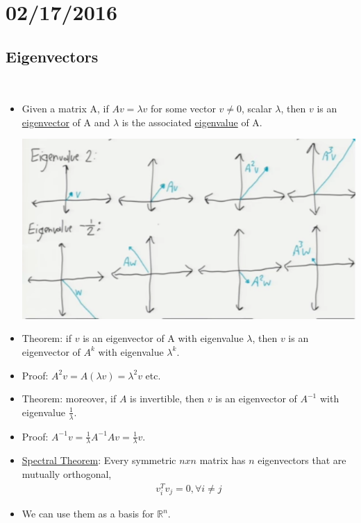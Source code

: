 \documentclass[10pt]{article}
\begin{document}
\newpage
\section*{02/17/2016}
	\subsection*{Eigenvectors}
	\
		\begin{itemize}
			\item Given a matrix A, if $Av = \lambda v$ for some vector $v \neq 0$, scalar $\lambda$, then $v$ is an \underline{eigenvector} of A and $\lambda$ is the associated \underline{eigenvalue} of A.
			
				\begin{center}
					\includegraphics[scale=0.5]{images/eigenvectors}
				\end{center}
			\item Theorem: if $v$ is an eigenvector of A with eigenvalue $\lambda$, then $v$ is an eigenvector of $A^{k}$ with eigenvalue $\lambda^{k}$.
			\item Proof: $A^{2}v = A(\lambda v) = \lambda^{2}v$ etc.
			\item Theorem: moreover, if $A$ is invertible, then $v$ is an eigenvector of $A^{-1}$ with eigenvalue $\frac{1}{\lambda}$.
			\item Proof: $A^{-1}v = \frac{1}{\lambda}A^{-1}Av = \frac{1}{\lambda}v$.
			\item \underline{Spectral Theorem}: Every symmetric $nxn$ matrix has $n$ eigenvectors that are mutually orthogonal,
				\begin{align*}
					v_{i}^{T}v_{j} = 0, \forall i\neq j
				\end{align*}
			\item We can use them as a basis for $\mathbb{R}^{n}$.
				\begin{center}

\end{center}
\end{itemize}
\end{document}

